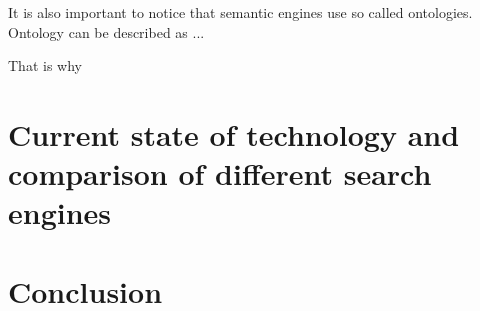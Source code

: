 \documentclass[10pt,twoside,a4paper]{article}
\begin{document}
\cite{intonw}

It is also important to notice that semantic engines  use so called ontologies. Ontology can be described as ...

That is why


\section{Current state of technology and comparison of different search engines}











\section{Conclusion}


 


\end{document}
